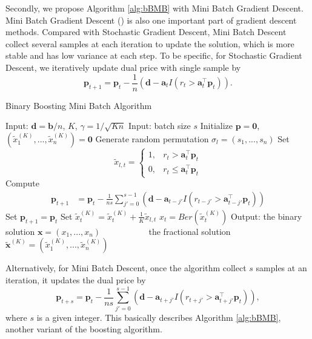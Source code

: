 \documentclass{article} %
\begin{document}
Secondly, we propose Algorithm \ref{alg:bBMB} with Mini Batch Gradient Descent. Mini Batch Gradient Descent (\cite{bottou2010large}) is also one important part of gradient descent methods. Compared with Stochastic Gradient Descent, Mini Batch Descent collect several samples at each iteration to update the solution, which is more stable and has low variance at each step. To be specific, for Stochastic Gradient Descent, we iteratively update dual price with single sample by
$$
    \bm{p}_{t+1}
    =
    \bm{p}_t
    -
    \frac{1}{n}(\bm{d}-\bm{a}_t I(r_t>\bm{a}_t^{\top}\bm{p}_t)).
$$

\begin{algorithm}[ht!]
\caption{Binary Boosting Mini Batch Algorithm}
\label{alg:bBMB}
\begin{algorithmic}[1]
\State Input: $\bm{d}=\bm{b}/n$, $K$, $\gamma=1/\sqrt{Kn}$
\State Input: batch size $s$
\State Initialize $\bm{p} = \bm{0}$, $(\tilde{{x}}^{(K)}_1,...,\tilde{{x}}^{(K)}_n)=\bm{0}$
    \State Generate random permutation $\sigma_l=(s_1,...,s_n)$
        \State Set 
            $$\tilde{x}_{l,t} = \begin{cases}
            1,& r_{t} >\bm{a}_{t}^\top \bm{p}_t \\
            0,& r_{t} \le \bm{a}_{t}^\top \bm{p}_t
            \end{cases}$$
            \State Compute
            \begin{align*}
                \bm{p}_{t+1} & = \bm{p}_t
                -
                 \frac{1}{ns}\sum\limits_{j'=0}^{s-1}(\bm{d}-\bm{a}_{t-j'} I(r_{t-j'}>\bm{a}_{t-j'}^{\top}\bm{p}_t))
            \end{align*}
            \Else
            \State Set $\bm{p}_{t+1}  = \bm{p}_t$
            \EndIf
            \State Set $\tilde{{x}}^{(K)}_t=\tilde{{x}}^{(K)}_t+\frac{1}{K}\tilde{{x}}_{l,t}$
    \EndFor
\EndFor
{}
    \State $x_t = Ber(\tilde{x}_t^{(K)})$
\EndFor
\State Output: the binary solution $\bm{x} = (x_1,...,x_n)$ 
\State ~~ ~~ ~~ ~~ the fractional solution $\tilde{\bm{x}}^{(K)}= (\tilde{x}_1^{(K)},...,\tilde{x}_n^{(K)})$
\end{algorithmic}
\end{algorithm}

Alternatively, for Mini Batch Descent, once the algorithm collect $s$ samples at an iteration, it updates the dual price by
$$
    \bm{p}_{t+s}
    =
    \bm{p}_t
    -
    \frac{1}{ns}\sum\limits_{j'=0}^{s-1}(\bm{d}-\bm{a}_{t+j'} I(r_{t+j'}>\bm{a}_{t+j'}^{\top}\bm{p}_t)),
$$
where $s$ is a given integer.
This basically describes Algorithm \ref{alg:bBMB}, another variant of the boosting algorithm.
\end{document}
